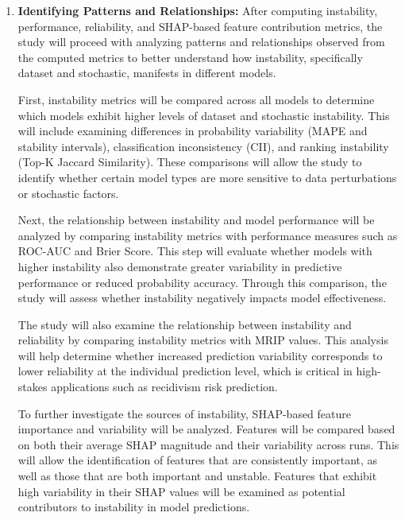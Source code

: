 \documentclass[12pt]{article}
\begin{document}
\begin{enumerate}
  To facilitate comparison, SHAP values will be aggregated across runs for each model, and summary statistics such as the mean and standard deviation will be computed for each feature. Visualizations, including SHAP summary plots and variability plots, will be used to illustrate the distribution and spread of SHAP values across runs. By integrating SHAP analysis with instability metrics, the study will identify features that consistently influence predictions as well as those whose contributions vary significantly, providing insight into how feature behavior contributes to model instability.

  \item \textbf{Identifying Patterns and Relationships:}
  After computing instability, performance, reliability, and SHAP-based feature contribution metrics, the study will proceed with analyzing patterns and relationships observed from the computed metrics to better understand how instability, specifically dataset and stochastic, manifests in different models.

  First, instability metrics will be compared across all models to determine which models exhibit higher levels of dataset and stochastic instability. This will include examining differences in probability variability (MAPE and stability intervals), classification inconsistency (CII), and ranking instability (Top-K Jaccard Similarity). These comparisons will allow the study to identify whether certain model types are more sensitive to data perturbations or stochastic factors.

  Next, the relationship between instability and model performance will be analyzed by comparing instability metrics with performance measures such as ROC-AUC and Brier Score. This step will evaluate whether models with higher instability also demonstrate greater variability in predictive performance or reduced probability accuracy. Through this comparison, the study will assess whether instability negatively impacts model effectiveness.

  The study will also examine the relationship between instability and reliability by comparing instability metrics with MRIP values. This analysis will help determine whether increased prediction variability corresponds to lower reliability at the individual prediction level, which is critical in high-stakes applications such as recidivism risk prediction.

  To further investigate the sources of instability, SHAP-based feature importance and variability will be analyzed. Features will be compared based on both their average SHAP magnitude and their variability across runs. This will allow the identification of features that are consistently important, as well as those that are both important and unstable. Features that exhibit high variability in their SHAP values will be examined as potential contributors to instability in model predictions.


\end{enumerate}
\end{document}
